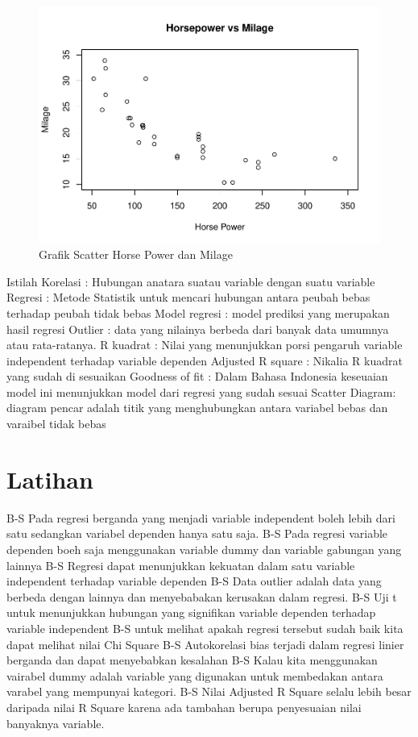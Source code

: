 \documentclass[
]{book}
\theoremstyle{definition}
\theoremstyle{definition}
\theoremstyle{definition}
\theoremstyle{definition}
\theoremstyle{remark}
\begin{document}
\begin{figure}
\centering
\includegraphics{docs/images/scatter-fig-1.pdf}
\caption{\label{fig:scatter-fig}Grafik Scatter Horse Power dan Milage}
\end{figure}

Istilah
Korelasi : Hubungan anatara suatau variable dengan suatu variable
Regresi : Metode Statistik untuk mencari hubungan antara peubah bebas terhadap peubah tidak bebas
Model regresi : model prediksi yang merupakan hasil regresi
Outlier : data yang nilainya berbeda dari banyak data umumnya atau rata-ratanya.
R kuadrat : Nilai yang menunjukkan porsi pengaruh variable independent terhadap variable dependen
Adjusted R square : Nikalia R kuadrat yang sudah di sesuaikan
Goodness of fit : Dalam Bahasa Indonesia keseuaian model ini menunjukkan model dari regresi yang sudah sesuai
Scatter Diagram: diagram pencar adalah titik yang menghubungkan antara variabel bebas dan varaibel tidak bebas

\hypertarget{latihan-1}{%
\section*{Latihan}\label{latihan-1}}

B-S Pada regresi berganda yang menjadi variable independent boleh lebih dari satu sedangkan variabel dependen hanya satu saja.
B-S Pada regresi variable dependen boeh saja menggunakan variable dummy dan variable gabungan yang lainnya
B-S Regresi dapat menunjukkan kekuatan dalam satu variable independent terhadap variable dependen
B-S Data outlier adalah data yang berbeda dengan lainnya dan menyebabakan kerusakan dalam regresi.
B-S Uji t untuk menunjukkan hubungan yang signifikan variable dependen terhadap variable independent
B-S untuk melihat apakah regresi tersebut sudah baik kita dapat melihat nilai Chi Square
B-S Autokorelasi bias terjadi dalam regresi linier berganda dan dapat menyebabkan kesalahan
B-S Kalau kita menggunakan vairabel dummy adalah variable yang digunakan untuk membedakan antara varabel yang mempunyai kategori.
B-S Nilai Adjusted R Square selalu lebih besar daripada nilai R Square karena ada tambahan berupa penyesuaian nilai banyaknya variable.
\end{document}
